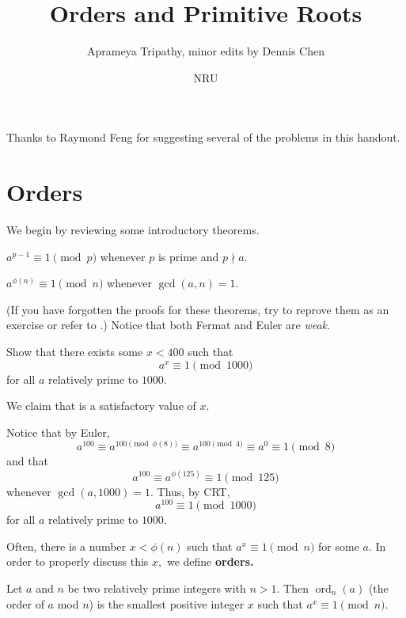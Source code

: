 \documentclass[mast]{lucky}
\title{Orders and Primitive Roots}
\author{Aprameya Tripathy, minor edits by Dennis Chen}
\date{NRU}
\begin{document}
\maketitle

Thanks to Raymond Feng for suggesting several of the problems in this handout.

\section{Orders}
We begin by reviewing some introductory theorems.

\begin{theo}[Fermat]
$a^{p-1} \equiv 1 \pmod{p}$ whenever $p$ is prime and $p \nmid a.$
\end{theo}

\begin{theo}[Euler]
$a^{\phi(n)} \equiv 1 \pmod{n}$ whenever $\gcd(a, n) = 1.$
\end{theo}

(If you have forgotten the proofs for these theorems, try to reprove them as an exercise or refer to .) Notice that both Fermat and Euler are \emph{weak.}

\begin{exam}
Show that there exists some $x < 400$ such that $$a^x \equiv 1 \pmod{1000}$$ for all $a$ relatively prime to $1000.$
\end{exam}

\begin{sol}
We claim that  is a satisfactory value of $x.$

Notice that by Euler, $$a^{100} \equiv a^{100 \pmod{\phi(8)}} \equiv a^{100 \pmod{4}} \equiv a^0 \equiv 1 \pmod{8}$$ and that $$a^{100} \equiv a^{\phi (125)} \equiv 1 \pmod{125}$$ whenever $\gcd(a, 1000) = 1.$ Thus, by CRT, $$a^{100} \equiv 1 \pmod{1000}$$ for all $a$ relatively prime to $1000.$
\end{sol}

Often, there is a number $x < \phi(n)$ such that $a^x \equiv 1 \pmod{n}$ for some $a.$ In order to properly discuss this $x,$ we define \textbf{orders.}

\begin{defi}[Orders]
Let $a$ and $n$ be two relatively prime integers with $n>1.$ Then $\operatorname{ord}_n(a)$ (the order of $a$ mod $n$) is the smallest positive integer $x$ such that $a^x \equiv 1 \pmod{n}.$
\end{defi}
\end{document}
